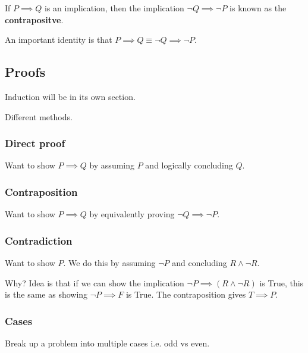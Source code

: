 \begin{definition}[Contrapositive]
    If $P \implies Q$ is an implication, then the implication $\neg Q \implies \neg P$ is known as the \textbf{contrapositve}.
\end{definition}

An important identity is that $P \implies Q \equiv \neg Q \implies \neg P$. 

\subsection{Proofs}
Induction will be in its own section.

Different methods. 

\subsubsection{Direct proof}
Want to show $P \implies Q$ by assuming $P$ and logically concluding $Q$. 

\subsubsection{Contraposition}
Want to show $P \implies Q$ by equivalently proving $\neg Q \implies \neg P$. 

\subsubsection{Contradiction}
Want to show $P$. We do this by assuming $\neg P$ and concluding $R \land \neg R$. 

Why? Idea is that if we can show the implication $\neg P \implies (R \land \neg R)$ is True, this is the same as showing $\neg P \implies F$ is True. The contraposition gives $T \implies P$. 

\subsubsection{Cases}
Break up a problem into multiple cases i.e. odd vs even. 